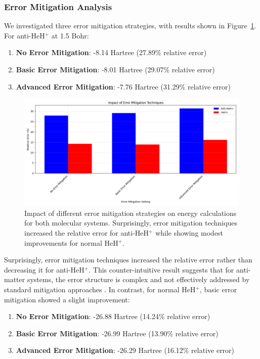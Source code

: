 \documentclass[10pt,twocolumn,a4paper]{article}
\begin{document}
\subsubsection{Error Mitigation Analysis}
We investigated three error mitigation strategies, with results shown in Figure~\ref{fig:error_mitigation}. For anti-HeH$^+$ at 1.5 Bohr:

\begin{enumerate}
    \item \textbf{No Error Mitigation}: -8.14 Hartree (27.89\% relative error)
    \item \textbf{Basic Error Mitigation}: -8.01 Hartree (29.07\% relative error)
    \item \textbf{Advanced Error Mitigation}: -7.76 Hartree (31.29\% relative error)
\end{enumerate}

\begin{figure}[t!]
    \centering
    \includegraphics[width=\columnwidth]{graphs/error_mitigation_impact.png}
    \caption{Impact of different error mitigation strategies on energy calculations for both molecular systems. Surprisingly, error mitigation techniques increased the relative error for anti-HeH$^+$ while showing modest improvements for normal HeH$^+$.}
    \label{fig:error_mitigation}
\end{figure}

Surprisingly, error mitigation techniques increased the relative error rather than decreasing it for anti-HeH$^+$. This counter-intuitive result suggests that for anti-matter systems, the error structure is complex and not effectively addressed by standard mitigation approaches \cite{temme2017error}. In contrast, for normal HeH$^+$, basic error mitigation showed a slight improvement:

\begin{enumerate}
    \item \textbf{No Error Mitigation}: -26.88 Hartree (14.24\% relative error)
    \item \textbf{Basic Error Mitigation}: -26.99 Hartree (13.90\% relative error)
    \item \textbf{Advanced Error Mitigation}: -26.29 Hartree (16.12\% relative error)
\end{enumerate}
\end{document}
